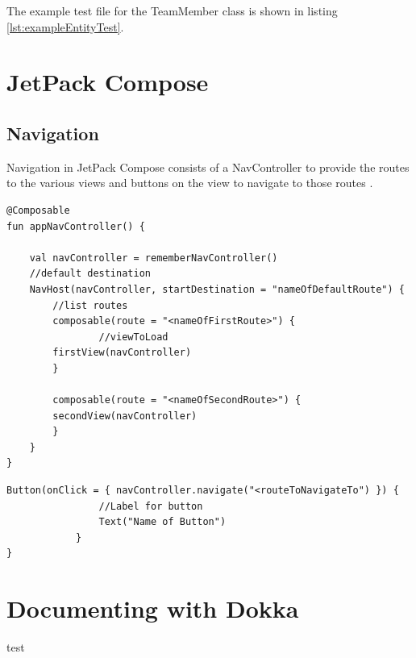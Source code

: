 \documentclass[12pt]{article}
\begin{document}


The example test file for the TeamMember class is shown in listing \ref{lst:exampleEntityTest}. 


\section{JetPack Compose}

\subsection{Navigation}
Navigation in JetPack Compose consists of a NavController to provide the routes to the various views and buttons on the view to navigate to those routes \cite{mediumJetpackNavigation} \cite{NavigationCodeLab}. 



\begin{lstlisting}[numbers=none, 
			caption=Function to create a simple Nav Controller,
			label={lst:navControllerFunction}]
@Composable
fun appNavController() {

    val navController = rememberNavController()
    //default destination
    NavHost(navController, startDestination = "nameOfDefaultRoute") {
    	//list routes
        composable(route = "<nameOfFirstRoute>") {
        	    //viewToLoad
	    firstView(navController)
        }
        
        composable(route = "<nameOfSecondRoute>") {
	    secondView(navController)
        }
    }
}
\end{lstlisting}


\begin{lstlisting}[numbers=none, 
			caption=Button to navigate to a view,
			label={lst:navButton}]
Button(onClick = { navController.navigate("<routeToNavigateTo") }) {
                //Label for button
                Text("Name of Button")
            }
}
\end{lstlisting}

\section{Documenting with Dokka}
test
\begin{appendix}
  \listoffigures
  \listoftables
  \lstlistoflistings

\end{appendix}
\RaggedRight
{}
  
\end{document}
